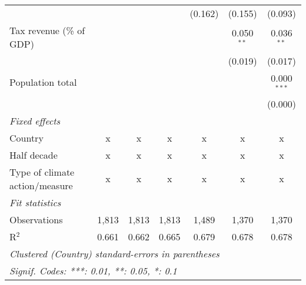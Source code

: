 \begin{tabular}{lcccccc}
                                                             &         &         &                & (0.162)        & (0.155)        & (0.093)\\   
   Tax revenue (\% of GDP)                                   &         &         &                &                & 0.050$^{**}$   & 0.036$^{**}$\\   
                                                             &         &         &                &                & (0.019)        & (0.017)\\   
   Population total                                          &         &         &                &                &                & 0.000$^{***}$\\   
                                                             &         &         &                &                &                & (0.000)\\   
   \emph{Fixed effects}\\
   Country                                                   & x       & x       & x              & x              & x              & x\\  
   Half decade                                               & x       & x       & x              & x              & x              & x\\  
   Type of climate action/measure                            & x       & x       & x              & x              & x              & x\\  
   \midrule \emph{Fit statistics}\\
   Observations                                              & 1,813   & 1,813   & 1,813          & 1,489          & 1,370          & 1,370\\  
   R$^2$                                                     & 0.661   & 0.662   & 0.665          & 0.679          & 0.678          & 0.678\\  
   \midrule
   \multicolumn{7}{l}{\emph{Clustered (Country) standard-errors in parentheses}}\\
   \multicolumn{7}{l}{\emph{Signif. Codes: ***: 0.01, **: 0.05, *: 0.1}}\\
\end{tabular}
\par\endgroup


